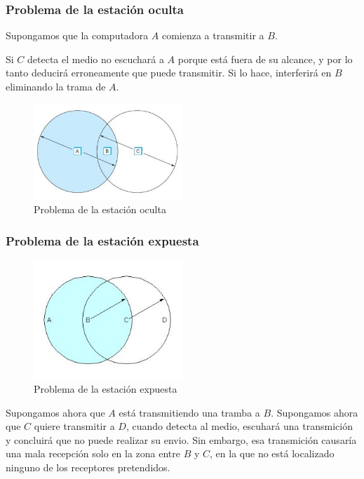 \subsubsection*{Problema de la estación oculta}
Supongamos que la computadora \(A\) comienza a transmitir a \(B\). 

Si \(C\) detecta el medio no escuchará a \(A\) porque está fuera de su alcance, y por lo tanto deducirá erroneamente que puede transmitir. Si lo hace, interferirá en \(B\) eliminando la trama de \(A\).

\begin{figure}[H]
	\centering
	\includegraphics[width=0.5\textwidth
]{images/estacion-oculta.jpg}
	\caption[Problema de la estación oculta]{Problema de la estación oculta}
	\label{fig:estacion-oculta}
\end{figure}

\subsubsection*{Problema de la estación expuesta}
\begin{figure}[H]
	\centering
	\includegraphics[width=0.5\textwidth
]{images/estacion-descubierta.jpg}
	\caption[Problema de la estación expuesta]{Problema de la estación expuesta}
	\label{fig:estacion-expuesta}
\end{figure}

Supongamos ahora que \(A\) está transmitiendo una tramba a \(B\). Supongamos ahora que \(C\) quiere transmitir a \(D\), cuando detecta al medio, escuhará una transmición y concluirá que no puede realizar su envio. Sin embargo, esa transmición causaría una mala recepción solo en la zona entre \(B\) y \(C\), en la que no está localizado ninguno de los receptores pretendidos.

\subsection{}

